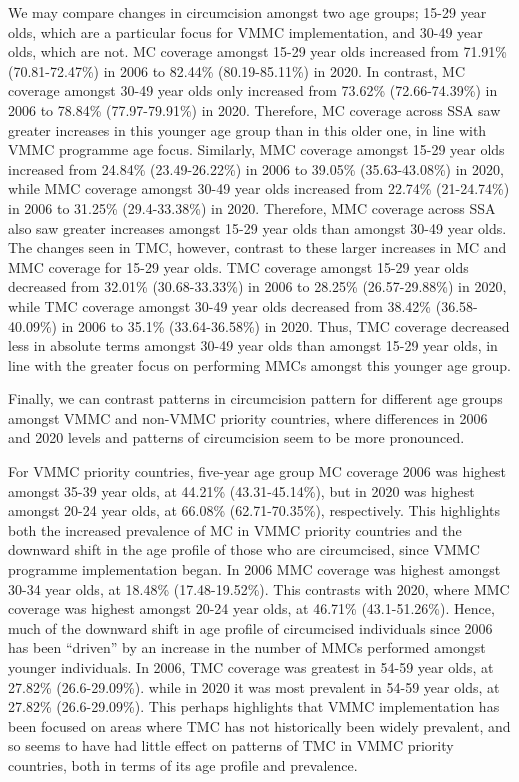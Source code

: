 \documentclass{article}
\begin{document}
We may compare changes in circumcision amongst two age groups; 15-29
year olds, which are a particular focus for VMMC implementation, and
30-49 year olds, which are not. MC coverage amongst 15-29 year olds
increased from 71.91\% (70.81-72.47\%) in 2006 to 82.44\%
(80.19-85.11\%) in 2020. In contrast, MC coverage amongst 30-49 year
olds only increased from 73.62\% (72.66-74.39\%) in 2006 to 78.84\%
(77.97-79.91\%) in 2020. Therefore, MC coverage across SSA saw greater
increases in this younger age group than in this older one, in line with
VMMC programme age focus. Similarly, MMC coverage amongst 15-29 year
olds increased from 24.84\% (23.49-26.22\%) in 2006 to 39.05\%
(35.63-43.08\%) in 2020, while MMC coverage amongst 30-49 year olds
increased from 22.74\% (21-24.74\%) in 2006 to 31.25\% (29.4-33.38\%) in
2020. Therefore, MMC coverage across SSA also saw greater increases
amongst 15-29 year olds than amongst 30-49 year olds. The changes seen
in TMC, however, contrast to these larger increases in MC and MMC
coverage for 15-29 year olds. TMC coverage amongst 15-29 year olds
decreased from 32.01\% (30.68-33.33\%) in 2006 to 28.25\%
(26.57-29.88\%) in 2020, while TMC coverage amongst 30-49 year olds
decreased from 38.42\% (36.58-40.09\%) in 2006 to 35.1\% (33.64-36.58\%)
in 2020. Thus, TMC coverage decreased less in absolute terms amongst
30-49 year olds than amongst 15-29 year olds, in line with the greater
focus on performing MMCs amongst this younger age group.

Finally, we can contrast patterns in circumcision pattern for different
age groups amongst VMMC and non-VMMC priority countries, where
differences in 2006 and 2020 levels and patterns of circumcision seem to
be more pronounced.

For VMMC priority countries, five-year age group MC coverage 2006 was
highest amongst 35-39 year olds, at 44.21\% (43.31-45.14\%), but in 2020
was highest amongst 20-24 year olds, at 66.08\% (62.71-70.35\%),
respectively. This highlights both the increased prevalence of MC in
VMMC priority countries and the downward shift in the age profile of
those who are circumcised, since VMMC programme implementation began. In
2006 MMC coverage was highest amongst 30-34 year olds, at 18.48\%
(17.48-19.52\%). This contrasts with 2020, where MMC coverage was
highest amongst 20-24 year olds, at 46.71\% (43.1-51.26\%). Hence, much
of the downward shift in age profile of circumcised individuals since
2006 has been ``driven'' by an increase in the number of MMCs performed
amongst younger individuals. In 2006, TMC coverage was greatest in 54-59
year olds, at 27.82\% (26.6-29.09\%). while in 2020 it was most
prevalent in 54-59 year olds, at 27.82\% (26.6-29.09\%). This perhaps
highlights that VMMC implementation has been focused on areas where TMC
has not historically been widely prevalent, and so seems to have had
little effect on patterns of TMC in VMMC priority countries, both in
terms of its age profile and prevalence.
\end{document}
